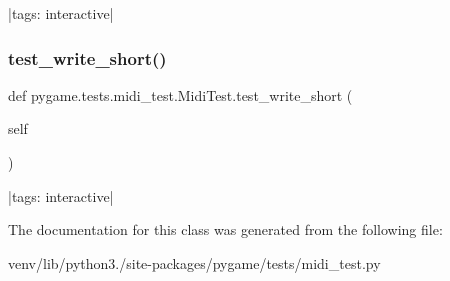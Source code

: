\begin{DoxyVerb}|tags: interactive|
\end{DoxyVerb}
 \mbox{\label{classpygame_1_1tests_1_1midi__test_1_1_midi_test_ac9d4d4a42572ccade01057dba3cb2037}} 
\subsubsection{\texorpdfstring{test\+\_\+write\+\_\+short()}{test\_write\_short()}}
{\footnotesize\ttfamily def pygame.\+tests.\+midi\+\_\+test.\+Midi\+Test.\+test\+\_\+write\+\_\+short (\begin{DoxyParamCaption}\item[{}]{self }\end{DoxyParamCaption})}

\begin{DoxyVerb}|tags: interactive|
\end{DoxyVerb}
 

The documentation for this class was generated from the following file\+:\begin{DoxyCompactItemize}
\item 
venv/lib/python3./site-\/packages/pygame/tests/midi\+\_\+test.\+py\end{DoxyCompactItemize}
